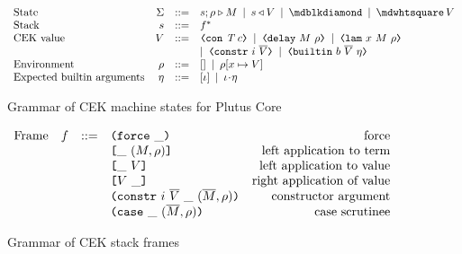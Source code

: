 \begin{figure}[H]
    \centering
    \[\begin{array}{lrclr}
    \textrm{State} & \Sigma & ::= & s;\rho \compute M \enspace | \enspace s \return V  \enspace |
       \enspace \cekerror{} \enspace | \enspace \cekhalt{V}\\
    \textrm{Stack} & s      & ::= & f^*\\
    \textrm{CEK value} & V &  ::= & \VCon{\tn}{c} \enspace | \enspace \VDelay{M}{\rho}
       \enspace| \enspace \VLamAbs{x}{M}{\rho} \enspace \\
       &&& | \enspace \VConstr{i}{\repetition{V}} \enspace | \enspace \VBuiltin{b}{\repetition{V}}{\eta}\\
    \textrm{Environment} & \rho & ::= & [] \enspace | \enspace \rho[x \mapsto V] \\
    \textrm{Expected builtin arguments} & \eta & ::= & [\iota] \enspace | \enspace \iota \cons \eta\\
    \end{array}\]
    \caption{Grammar of CEK machine states for Plutus Core}
    \label{fig:untyped-cek-states}
\end{figure}%
%
%
%
%
%

\begin{figure}[H]
    \centering
    \[\begin{array}{lrclr}
        \textrm{Frame} & f  & ::=   & \texttt{(} \texttt{force} ~ \_ \texttt{)}                                                       & \textrm{force}\\
                       &    &       & \texttt{[} \_ ~ (M,\rho) \texttt{]}                                           & \textrm{left application to term}\\
                       &    &       & \texttt{[} \_ ~ V \texttt{]}                                                  & \textrm{left application to value}\\
                       &    &       & \texttt{[} V ~ \_ \texttt{]}                                                 & \textrm{right application of value}\\
                       &    &       & \texttt{(} \texttt{constr} ~ i ~ \overline{V} ~ \_ ~ (\overline{M}, \rho) \texttt{)}           & \textrm{constructor argument}\\
                       &    &       & \texttt{(} \texttt{case} ~ \_ ~ (\overline{M}, \rho) \texttt{)}                                & \textrm{case scrutinee}
    \end{array}\]
    \caption{Grammar of CEK stack frames}
    \label{fig:untyped-cek-reduction-frames}
\end{figure}%

